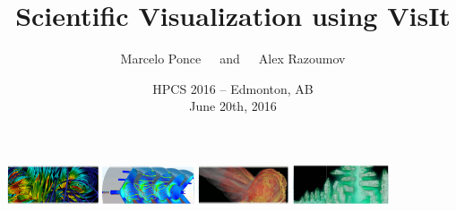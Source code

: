 \documentclass[xcolor=svgnames]{beamer}
\begin{document}
\title[VisIt Workshop]{\Large\bf Scientific Visualization using VisIt}
\author[\textbf{M.Ponce} \& \textbf{A.Razoumov}]{\Large {\sc Marcelo Ponce}~~~and~~~{\sc Alex Razoumov}}
\date[HPCS 2016]{HPCS 2016 -- Edmonton, AB \\ June 20th, 2016}

\begin{frame}
  \centering
\href{https://wci.llnl.gov/simulation/computer-codes/visit/}{\includegraphics[height=1.15cm]{./figs/visit-logos/VisIt-01}} \href{https://wci.llnl.gov/simulation/computer-codes/visit/}{\includegraphics[height=1.15cm]{./figs/visit-logos/VisIt-02}} \href{https://wci.llnl.gov/simulation/computer-codes/visit/}{\includegraphics[height=1.15cm]{./figs/visit-logos/VisIt-03}} \href{https://wci.llnl.gov/simulation/computer-codes/visit/}{\includegraphics[height=1.15cm]{./figs/visit-logos/VisIt-04}}

  \vspace{-.25cm}

  \titlepage
\end{frame}
\end{document}
